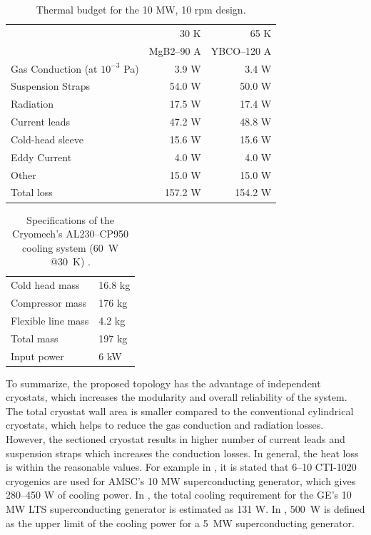 \documentclass[12pt]{iopart}
\begin{document}
\begin{table}
  \centering
  \begin{tabular}{lrr}
& 30 K & 65 K \\
& MgB2--90 A & YBCO--120 A \\
\hline
Gas Conduction (at $10^{-3}$ Pa) & 3.9 W & 3.4 W\\
Suspension Straps & 54.0 W & 50.0 W\\
Radiation & 17.5 W & 17.4 W\\
Current leads & 47.2 W & 48.8 W \\
Cold-head sleeve & 15.6 W & 15.6 W\\
Eddy Current & 4.0 W & 4.0 W\\
Other & 15.0 W & 15.0 W\\
\hline
Total loss & 157.2 W & 154.2 W\\
\hline
 \end{tabular}
  \caption{Thermal budget for the 10 MW, 10 rpm design. }
  \label{10MW_thermal_budget}
\end{table}

\begin{table}
  \centering
  \begin{tabular}{ll}
\hline
Cold head mass & 16.8 kg \\
Compressor mass & 176 kg \\
Flexible line mass & 4.2 kg \\
Total mass & 197 kg \\
Input power & 6 kW \\
\hline
 \end{tabular}
  \caption{Specifications of the Cryomech's AL230--CP950 cooling system (60~W @30~K) \cite{Cryomech2007}.}
  \label{cryocooler_spec}
\end{table}

To summarize, the proposed topology has the advantage of independent cryostats, which increases the modularity and overall reliability of the system. The total cryostat wall area is smaller compared to the conventional cylindrical cryostats, which helps to reduce the gas conduction and radiation losses. However, the sectioned cryostat results in higher number of current leads and suspension straps which increases the conduction losses. In general, the heat loss is within the reasonable values. For example in \cite{Snitchler2011}, it is stated that 6--10 CTI-1020 cryogenics are used for AMSC's 10 MW superconducting generator, which gives 280--450 W of cooling power.
In \cite{Stautner2012}, the total cooling requirement for the GE's 10 MW LTS superconducting generator is estimated as 131 W. In \cite{Abrahamsen2012}, 500~W is defined as the upper limit of the cooling power for a 5~MW superconducting generator.
\end{document}
